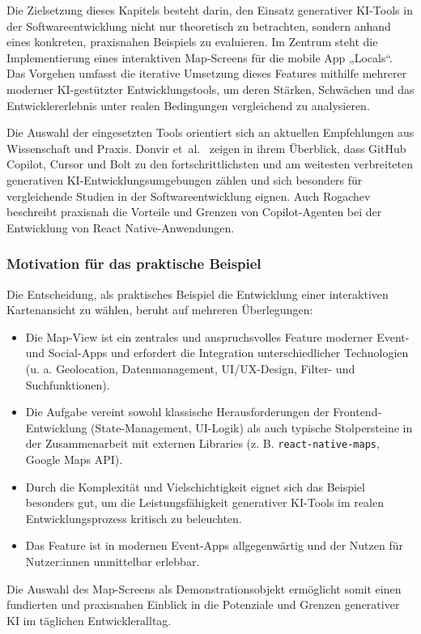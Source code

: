 
Die Zielsetzung dieses Kapitels besteht darin, den Einsatz generativer KI-Tools
in der Softwareentwicklung nicht nur theoretisch zu betrachten, sondern anhand
eines konkreten, praxisnahen Beispiels zu evaluieren. Im Zentrum steht die
Implementierung eines interaktiven Map-Screens für die mobile App „Locals“. Das
Vorgehen umfasst die iterative Umsetzung dieses Features mithilfe mehrerer
moderner KI-gestützter Entwicklungstools, um deren Stärken, Schwächen und das
Entwicklererlebnis unter realen Bedingungen vergleichend zu analysieren.

Die Auswahl der eingesetzten Tools orientiert sich an aktuellen Empfehlungen
aus Wissenschaft und Praxis. Donvir et~al.~\cite{donvir_role_2024} zeigen in
ihrem Überblick, dass GitHub Copilot, Cursor und Bolt zu den
fortschrittlichsten und am weitesten verbreiteten generativen
KI-Entwicklungsumgebungen zählen und sich besonders für vergleichende Studien
in der Softwareentwicklung eignen. Auch Rogachev~\cite{rogachev_my_nodate}
beschreibt praxisnah die Vorteile und Grenzen von Copilot-Agenten bei der
Entwicklung von React Native-Anwendungen.

\subsubsection{Motivation für das praktische Beispiel}

Die Entscheidung, als praktisches Beispiel die Entwicklung einer interaktiven
Kartenansicht zu wählen, beruht auf mehreren Überlegungen:
\begin{itemize}
      \item Die Map-View ist ein zentrales und anspruchsvolles Feature moderner Event- und
            Social-Apps und erfordert die Integration unterschiedlicher Technologien (u. a.
            Geolocation, Datenmanagement, UI/UX-Design, Filter- und Suchfunktionen).
      \item Die Aufgabe vereint sowohl klassische Herausforderungen der
            Frontend-Entwicklung (State-Management, UI-Logik) als auch typische
            Stolpersteine in der Zusammenarbeit mit externen Libraries (z. B.
            \texttt{react-native-maps}, Google Maps API).
      \item Durch die Komplexität und Vielschichtigkeit eignet sich das Beispiel besonders
            gut, um die Leistungsfähigkeit generativer KI-Tools im realen
            Entwicklungsprozess kritisch zu beleuchten.
      \item Das Feature ist in modernen Event-Apps allgegenwärtig und der Nutzen für
            Nutzer:innen unmittelbar erlebbar.
\end{itemize}
Die Auswahl des Map-Screens als Demonstrationsobjekt ermöglicht somit einen fundierten und praxisnahen Einblick in die Potenziale und Grenzen generativer KI im täglichen Entwickleralltag.

